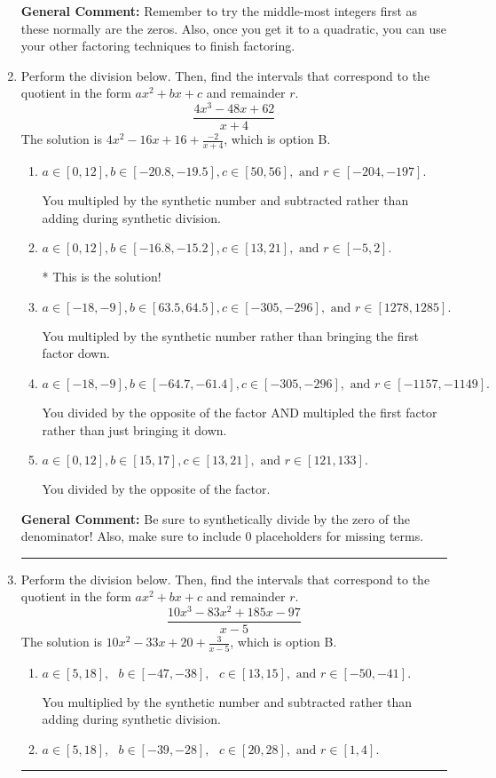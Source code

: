 \documentclass{extbook}[14pt]
\newcommand{\litem}[1]{\item #1

\rule{\textwidth}{0.4pt}}
\begin{document}
\begin{enumerate}
{\textbf{General Comment:} Remember to try the middle-most integers first as these normally are the zeros. Also, once you get it to a quadratic, you can use your other factoring techniques to finish factoring.
}
\litem{
Perform the division below. Then, find the intervals that correspond to the quotient in the form $ax^2+bx+c$ and remainder $r$.
\[ \frac{4x^{3} -48 x + 62}{x + 4} \]The solution is \( 4x^{2} -16 x + 16 + \frac{-2}{x + 4} \), which is option B.\begin{enumerate}[label=\Alph*.]
\item \( a \in [0, 12], b \in [-20.8, -19.5], c \in [50, 56], \text{ and } r \in [-204, -197]. \)

 You multipled by the synthetic number and subtracted rather than adding during synthetic division.
\item \( a \in [0, 12], b \in [-16.8, -15.2], c \in [13, 21], \text{ and } r \in [-5, 2]. \)

* This is the solution!
\item \( a \in [-18, -9], b \in [63.5, 64.5], c \in [-305, -296], \text{ and } r \in [1278, 1285]. \)

 You multipled by the synthetic number rather than bringing the first factor down.
\item \( a \in [-18, -9], b \in [-64.7, -61.4], c \in [-305, -296], \text{ and } r \in [-1157, -1149]. \)

 You divided by the opposite of the factor AND multipled the first factor rather than just bringing it down.
\item \( a \in [0, 12], b \in [15, 17], c \in [13, 21], \text{ and } r \in [121, 133]. \)

 You divided by the opposite of the factor.
\end{enumerate}

\textbf{General Comment:} Be sure to synthetically divide by the zero of the denominator! Also, make sure to include 0 placeholders for missing terms.
}
\litem{
Perform the division below. Then, find the intervals that correspond to the quotient in the form $ax^2+bx+c$ and remainder $r$.
\[ \frac{10x^{3} -83 x^{2} +185 x -97}{x -5} \]The solution is \( 10x^{2} -33 x + 20 + \frac{3}{x -5} \), which is option B.\begin{enumerate}[label=\Alph*.]
\item \( a \in [5, 18], \text{   } b \in [-47, -38], \text{   } c \in [13, 15], \text{   and   } r \in [-50, -41]. \)

 You multiplied by the synthetic number and subtracted rather than adding during synthetic division.
\item \( a \in [5, 18], \text{   } b \in [-39, -28], \text{   } c \in [20, 28], \text{   and   } r \in [1, 4]. \)


\end{enumerate}}
\end{enumerate}
\end{document}

